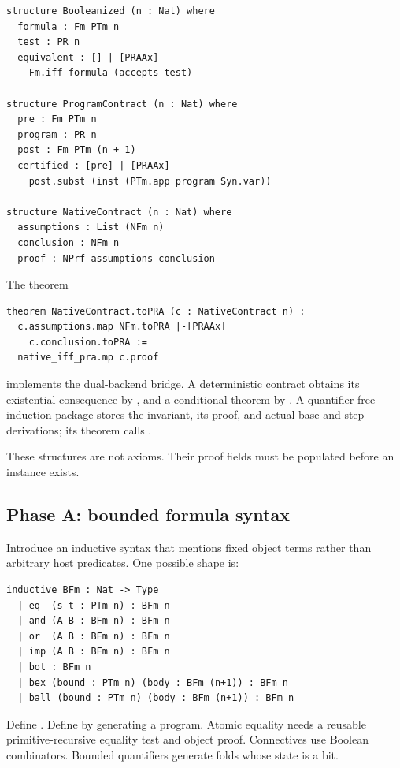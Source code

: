 \begin{lstlisting}[language=Lean]
structure Booleanized (n : Nat) where
  formula : Fm PTm n
  test : PR n
  equivalent : [] |-[PRAAx]
    Fm.iff formula (accepts test)

structure ProgramContract (n : Nat) where
  pre : Fm PTm n
  program : PR n
  post : Fm PTm (n + 1)
  certified : [pre] |-[PRAAx]
    post.subst (inst (PTm.app program Syn.var))

structure NativeContract (n : Nat) where
  assumptions : List (NFm n)
  conclusion : NFm n
  proof : NPrf assumptions conclusion
\end{lstlisting}

The theorem
\begin{lstlisting}[language=Lean]
theorem NativeContract.toPRA (c : NativeContract n) :
  c.assumptions.map NFm.toPRA |-[PRAAx]
    c.conclusion.toPRA :=
  native_iff_pra.mp c.proof
\end{lstlisting}
implements the dual-backend bridge.  A deterministic contract obtains its existential consequence by , and a conditional theorem by .  A quantifier-free induction package stores the invariant, its  proof, and actual base and step derivations; its  theorem calls .

These structures are not axioms.  Their proof fields must be populated before an instance exists.

\subsection{Phase A: bounded formula syntax}

Introduce an inductive syntax that mentions fixed object terms rather than arbitrary host predicates.  One possible shape is:

\begin{lstlisting}[language=Lean]
inductive BFm : Nat -> Type
  | eq  (s t : PTm n) : BFm n
  | and (A B : BFm n) : BFm n
  | or  (A B : BFm n) : BFm n
  | imp (A B : BFm n) : BFm n
  | bot : BFm n
  | bex (bound : PTm n) (body : BFm (n+1)) : BFm n
  | ball (bound : PTm n) (body : BFm (n+1)) : BFm n
\end{lstlisting}

Define .  Define  by generating a  program.  Atomic equality needs a reusable primitive-recursive equality test and object proof.  Connectives use Boolean combinators.  Bounded quantifiers generate folds whose state is a bit.


